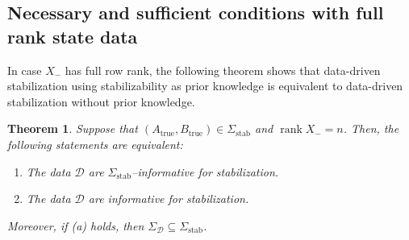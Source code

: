 \documentclass[9pt,shortpaper,twoside,web]{ieeecolor}
\DeclareMathOperator{\rank}{rank}
\newtheorem{theorem}{Theorem}
\begin{document}
\subsection{Necessary and sufficient conditions with full rank state data}
\label{sec:IV-A}

In case $X_-$ has full row rank, the following theorem shows that data-driven stabilization using stabilizability as prior knowledge is equivalent to data-driven stabilization without prior knowledge. 

\begin{theorem}
\label{th:12}
Suppose that $(A_\text{true},\!B_\text{true})\!\in\!\Sigma_\text{stab}$ and $\rank X_-\!=\!n$. Then, the following statements are equivalent: 
\begin{enumerate}[label=(\alph*),ref=\ref{th:12}(\alph*)]
    \item The data $\mathcal{D}$ are $\Sigma_\text{stab}$--informative for stabilization.
    \item The data $\mathcal{D}$ are informative for stabilization.
\end{enumerate}
Moreover, if (a) holds, then $\Sigma_\mathcal{D}\subseteq\Sigma_\text{stab}$.
\end{theorem}
\end{document}
